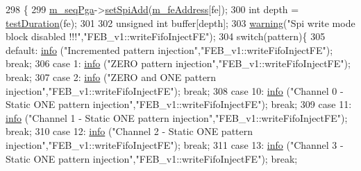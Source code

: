 \begin{DoxyCode}
298                                                   \{
299   \hyperlink{classFEB__v1_a6c7804ac86796f233a8393043adf2e77}{m\_seqPga}->\hyperlink{classSeqPGA_ac998ce3a6d9b5f2e88cc8393f8c1df53}{setSpiAdd}(\hyperlink{classFEB__v1_a4e1945c2d5b434125f375e9d0fc6d99f}{m\_feAddress}[fe]);
300   \textcolor{keywordtype}{int} depth = \hyperlink{classFEB__v1_a7f1db8ca9490172fce7603da9e703dec}{testDuration}(fe);
301  
302   \textcolor{keywordtype}{unsigned} \textcolor{keywordtype}{int} buffer[depth];
303   \hyperlink{classObject_a65cd4fda577711660821fd2cd5a3b4c9}{warning}(\textcolor{stringliteral}{"Spi write mode block disabled !!!"},\textcolor{stringliteral}{"FEB\_v1::writeFifoInjectFE"});        
304   \textcolor{keywordflow}{switch}(pattern)\{
305   \textcolor{keywordflow}{default}: \hyperlink{classObject_a644fd329ea4cb85f54fa6846484b84a8}{info} (\textcolor{stringliteral}{"Incremented pattern injection"},\textcolor{stringliteral}{"FEB\_v1::writeFifoInjectFE"}); \textcolor{keywordflow}{break};
306   \textcolor{keywordflow}{case} 1:  \hyperlink{classObject_a644fd329ea4cb85f54fa6846484b84a8}{info} (\textcolor{stringliteral}{"ZERO pattern injection"},\textcolor{stringliteral}{"FEB\_v1::writeFifoInjectFE"}); \textcolor{keywordflow}{break};
307   \textcolor{keywordflow}{case} 2:  \hyperlink{classObject_a644fd329ea4cb85f54fa6846484b84a8}{info} (\textcolor{stringliteral}{"ZERO and ONE pattern injection"},\textcolor{stringliteral}{"FEB\_v1::writeFifoInjectFE"}); \textcolor{keywordflow}{break};
308   \textcolor{keywordflow}{case} 10:  \hyperlink{classObject_a644fd329ea4cb85f54fa6846484b84a8}{info} (\textcolor{stringliteral}{"Channel 0 - Static ONE pattern injection"},\textcolor{stringliteral}{"FEB\_v1::writeFifoInjectFE"}); \textcolor{keywordflow}{break};
309   \textcolor{keywordflow}{case} 11:  \hyperlink{classObject_a644fd329ea4cb85f54fa6846484b84a8}{info} (\textcolor{stringliteral}{"Channel 1 - Static ONE pattern injection"},\textcolor{stringliteral}{"FEB\_v1::writeFifoInjectFE"}); \textcolor{keywordflow}{break};
310   \textcolor{keywordflow}{case} 12:  \hyperlink{classObject_a644fd329ea4cb85f54fa6846484b84a8}{info} (\textcolor{stringliteral}{"Channel 2 - Static ONE pattern injection"},\textcolor{stringliteral}{"FEB\_v1::writeFifoInjectFE"}); \textcolor{keywordflow}{break};
311   \textcolor{keywordflow}{case} 13:  \hyperlink{classObject_a644fd329ea4cb85f54fa6846484b84a8}{info} (\textcolor{stringliteral}{"Channel 3 - Static ONE pattern injection"},\textcolor{stringliteral}{"FEB\_v1::writeFifoInjectFE"}); \textcolor{keywordflow}{break};

\end{DoxyCode}
